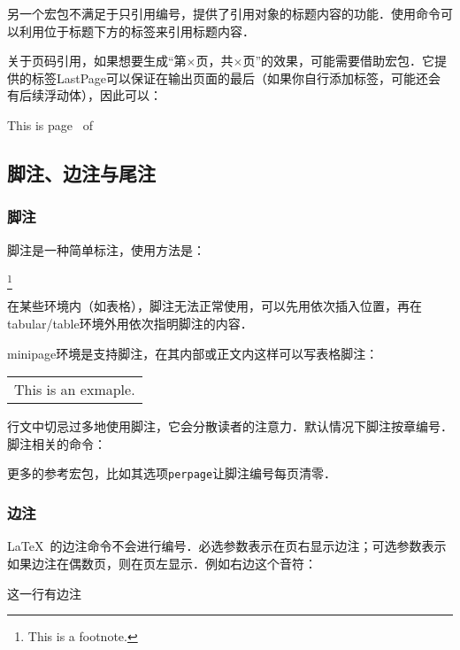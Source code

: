 另一个宏包不满足于只引用编号，提供了引用对象的标题内容的功能．使用命令可以利用位于标题下方的标签来引用标题内容．

关于页码引用，如果想要生成“第$\times$页，共$\times$页”的效果，可能需要借助宏包．它提供的标签LastPage可以保证在输出页面的最后（如果你自行添加标签，可能还会有后续浮动体），因此可以：
\begin{codeshow}
This is page \thepage\ of \pageref{LastPage}
\end{codeshow}

\subsection{脚注、边注与尾注}
\subsubsection{脚注}
脚注是一种简单标注，使用方法是：
\begin{latex}
\footnote{This is a footnote.}
\end{latex}

在某些环境内（如表格），脚注无法正常使用，可以先用依次插入位置，再在tabular/table环境外用依次指明脚注的内容．

minipage环境是支持脚注，在其内部或正文内这样可以写表格脚注：

\begin{codeshow}
\begin{minipage}{\linewidth}
\begin{tabular}{l}
This is an exmaple\footnotemark. 
\end{tabular}
\end{minipage}
\end{codeshow}

行文中切忌过多地使用脚注，它会分散读者的注意力．默认情况下脚注按章编号．脚注相关的命令：
\begin{latex}
\caption{Titel\protect\footnote{This is footnote.}}
\renewcommand\footnoterule{\rule{0.4\columnwidth}{0.4pt}}
\setlength{\skip\footins}{0.5cm}
\end{latex}

更多的参考宏包，比如其选项\texttt{perpage}让脚注编号每页清零．

\subsubsection{边注}
\LaTeX\ 的边注命令不会进行编号．必选参数表示在页右显示边注；可选参数表示如果边注在偶数页，则在页左显示．例如右边这个音符：\marginpar{\twonotes}
\begin{latex}
这一行有边注
\end{latex}

